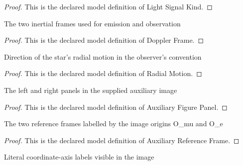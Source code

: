 \begin{proof}
  This is the declared model definition of Light Signal Kind.
\end{proof}
\begin{definition}
  \label{def:physics:phyx-mini-0567:phyxminiproblems-problemphyxmini0567-dopplerframe}
  The two inertial frames used for emission and observation
\end{definition}
\begin{proof}
  This is the declared model definition of Doppler Frame.
\end{proof}
\begin{definition}
  \label{def:physics:phyx-mini-0567:phyxminiproblems-problemphyxmini0567-radialmotion}
  Direction of the star's radial motion in the observer's convention
\end{definition}
\begin{proof}
  This is the declared model definition of Radial Motion.
\end{proof}
\begin{definition}
  \label{def:physics:phyx-mini-0567:phyxminiproblems-problemphyxmini0567-auxiliaryfigurepanel}
  The left and right panels in the supplied auxiliary image
\end{definition}
\begin{proof}
  This is the declared model definition of Auxiliary Figure Panel.
\end{proof}
\begin{definition}
  \label{def:physics:phyx-mini-0567:phyxminiproblems-problemphyxmini0567-auxiliaryreferenceframe}
  The two reference frames labelled by the image origins O\_mu and O\_e
\end{definition}
\begin{proof}
  This is the declared model definition of Auxiliary Reference Frame.
\end{proof}
\begin{definition}
  \label{def:physics:phyx-mini-0567:phyxminiproblems-problemphyxmini0567-auxiliaryaxislabel}
  Literal coordinate-axis labels visible in the image
\end{definition}
